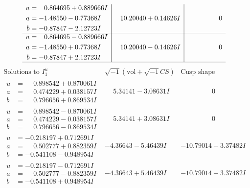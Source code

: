 \documentclass[1p]{elsarticle_modified}
\theoremstyle{definition}
\newcommand{\I}{\sqrt{-1}}
\begin{document}
$$\begin{array}{c|c|c}
\begin{aligned}
u &= \phantom{-}0.864695 + 0.889666 I \\
a &= -1.48550 - 0.77368 I \\
b &= -0.87847 - 2.12723 I\end{aligned}
 & \phantom{-}10.20040 + 0.14626 I & \phantom{-0.000000 } 0 \\ \hline\begin{aligned}
u &= \phantom{-}0.864695 - 0.889666 I \\
a &= -1.48550 + 0.77368 I \\
b &= -0.87847 + 2.12723 I\end{aligned}
 & \phantom{-}10.20040 - 0.14626 I & \phantom{-0.000000 } 0\\
 \hline 
 \end{array}$$\newpage$$\begin{array}{c|c|c}  
\text{Solutions to }I^u_{1}& \I (\text{vol} + \sqrt{-1}CS) & \text{Cusp shape}\\
 \hline 
\begin{aligned}
u &= \phantom{-}0.898542 + 0.870061 I \\
a &= \phantom{-}0.474229 + 0.038157 I \\
b &= \phantom{-}0.796656 + 0.869534 I\end{aligned}
 & \phantom{-}5.34141 - 3.08631 I & \phantom{-0.000000 } 0 \\ \hline\begin{aligned}
u &= \phantom{-}0.898542 - 0.870061 I \\
a &= \phantom{-}0.474229 - 0.038157 I \\
b &= \phantom{-}0.796656 - 0.869534 I\end{aligned}
 & \phantom{-}5.34141 + 3.08631 I & \phantom{-0.000000 } 0 \\ \hline\begin{aligned}
u &= -0.218197 + 0.712691 I \\
a &= \phantom{-}0.502777 + 0.882359 I \\
b &= -0.541108 - 0.948954 I\end{aligned}
 & -4.36643 - 5.46439 I & -10.79014 + 3.37482 I \\ \hline\begin{aligned}
u &= -0.218197 - 0.712691 I \\
a &= \phantom{-}0.502777 - 0.882359 I \\
b &= -0.541108 + 0.948954 I\end{aligned}
 & -4.36643 + 5.46439 I & -10.79014 - 3.37482 I \\ \hline\begin{aligned}

\end{aligned}
\end{array}$$
\end{document}

